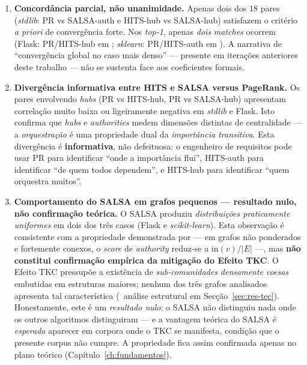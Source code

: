 \begin{enumerate}
    \item \textbf{Concordância parcial, não unanimidade.} Apenas
        dois dos $18$ pares (\emph{stdlib}: PR vs SALSA-auth e
        HITS-hub vs SALSA-hub) satisfazem o critério \emph{a priori}
        de convergência forte. Nos \emph{top-1}, apenas \emph{dois}
        \emph{matches} ocorrem (Flask: PR/HITS-hub em
        ; \emph{sklearn}: PR/HITS-auth
        em ). A narrativa de ``convergência global
        no caso mais denso'' --- presente em iterações anteriores
        deste trabalho --- não se sustenta face aos coeficientes
        formais.

    \item \textbf{Divergência informativa entre HITS e SALSA versus
        PageRank.} Os pares envolvendo \emph{hubs} (PR vs HITS-hub,
        PR vs SALSA-hub) apresentam correlação muito baixa ou
        ligeiramente negativa em \emph{stdlib} e Flask. Isto confirma
        que \emph{hubs} e \emph{authorities} medem dimensões
        distintas de centralidade --- a \emph{orquestração} é uma
        propriedade dual da \emph{importância transitiva}. Esta
        divergência é \textbf{informativa}, não defeituosa: o
        engenheiro de requisitos pode usar PR para identificar
        ``onde a importância flui'', HITS-auth para identificar
        ``de quem todos dependem'', e HITS-hub para identificar
        ``quem orquestra muitos''.

    \item \textbf{Comportamento do SALSA em grafos pequenos
        --- resultado nulo, não confirmação teórica.}
        O SALSA produziu \emph{distribuições praticamente uniformes}
        em dois dos três casos (Flask e \emph{scikit-learn}). Esta
        observação é consistente com a propriedade demonstrada por
        \citet{lempel2001} --- em grafos não ponderados e fortemente
        conexos, o \emph{score} de \emph{authority} reduz-se a
        $\text{in}(v)/|E|$ ---, mas \textbf{não constitui
        confirmação empírica da mitigação do Efeito TKC}. O Efeito
        TKC pressupõe a existência de \emph{sub-comunidades
        densamente coesas} embutidas em estruturas maiores; nenhum
        dos três grafos analisados apresenta tal característica
        (\cf\ análise estrutural em
        Secção~\ref{sec:res-tec}). Honestamente, este é um
        \emph{resultado nulo}: o SALSA não distinguiu nada onde os
        outros algoritmos distinguiram --- e a vantagem teórica do
        SALSA é \emph{esperada} aparecer em corpora onde o TKC se
        manifesta, condição que o presente corpus não cumpre. A
        propriedade fica assim confirmada apenas no plano teórico
        (Capítulo~\ref{ch:fundamentos}).


\end{enumerate}
